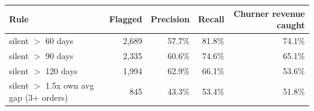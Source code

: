 \begin{tabular}{lrrrr}
\toprule
Rule & Flagged & Precision & Recall & Churner revenue caught \\
\midrule
silent $>$ 60 days & 2,689 & 57.7\% & 81.8\% & 74.1\% \\
silent $>$ 90 days & 2,335 & 60.6\% & 74.6\% & 65.1\% \\
silent $>$ 120 days & 1,994 & 62.9\% & 66.1\% & 53.6\% \\
silent $>$ 1.5x own avg gap (3+ orders) & 845 & 43.3\% & 53.4\% & 51.8\% \\
\bottomrule
\end{tabular}
